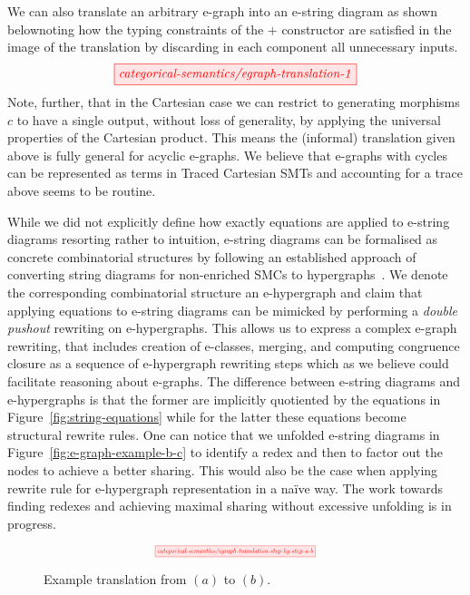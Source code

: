 \documentclass[sigconf, 9pt, nonacm]{acmart}
\theoremstyle{definition}
\begin{document}
We can also translate an arbitrary e-graph into an e-string diagram as shown belownoting how the typing constraints of the $+$ constructor are satisfied in the image of the translation by discarding in each component all unnecessary inputs.
\[
    \tikzfig{categorical-semantics/egraph-translation-1}
\]
Note, further, that in the Cartesian case we can restrict to generating morphisms $c$ to have a single output,  without loss of generality,  by applying the universal properties of the Cartesian product.  This means the (informal) translation given above is fully general for acyclic e-graphs.
We believe that e-graphs with cycles can be represented as terms in Traced Cartesian SMTs and accounting for a trace above seems to be routine.


While we did not explicitly define how exactly equations are applied to e-string diagrams resorting rather to intuition, e-string diagrams can be formalised as concrete combinatorial structures by following an established approach of converting string diagrams for non-enriched SMCs to hypergraphs~\cite{bonchi_string_2022,bonchi_string_2022-1,bonchi_string_2022-2}.
We denote the corresponding combinatorial structure an e-hypergraph and claim that applying equations to e-string diagrams can be mimicked by performing a \textit{double pushout} rewriting on e-hypergraphs.
This allows us to express a complex e-graph rewriting, that includes creation of e-classes, merging, and computing congruence closure as a sequence of e-hypergraph rewriting steps which as we believe could facilitate reasoning about e-graphs.
The difference between e-string diagrams and e-hypergraphs is that the former are implicitly quotiented by the equations in Figure~\ref{fig:string-equations} while for the latter these equations become structural rewrite rules.
One can notice that we unfolded e-string diagrams in Figure~\ref{fig:e-graph-example-b-c} to identify a redex and then to factor out the nodes to achieve a better sharing.
This would also be the case when applying rewrite rule for e-hypergraph representation in a na\"ive way.
The work towards finding redexes and achieving maximal sharing without excessive unfolding is in progress.

\begin{figure*}
    \[
        \scalebox{0.5}{
        \tikzfig{categorical-semantics/egraph-translation-step-by-step-a-b}
        }
    \]
    \caption{Example translation from $(a)$ to $(b)$.}
    \label{fig:e-graph-example-a-b}
\end{figure*}
\end{document}

